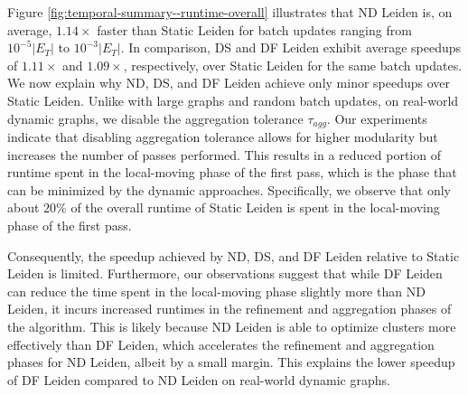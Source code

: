 Figure \ref{fig:temporal-summary--runtime-overall} illustrates that ND Leiden is, on average, $1.14\times$ faster than Static Leiden for batch updates ranging from $10^{-5}|E_T|$ to $10^{-3}|E_T|$. In comparison, DS and DF Leiden exhibit average speedups of $1.11\times$ and $1.09\times$, respectively, over Static Leiden for the same batch updates. We now explain why ND, DS, and DF Leiden achieve only minor speedups over Static Leiden. Unlike with large graphs and random batch updates, on real-world dynamic graphs, we disable the aggregation tolerance $\tau_{agg}$. Our experiments indicate that disabling aggregation tolerance allows for higher modularity but increases the number of passes performed. This results in a reduced portion of runtime spent in the local-moving phase of the first pass, which is the phase that can be minimized by the dynamic approaches. Specifically, we observe that only about $20\%$ of the overall runtime of Static Leiden is spent in the local-moving phase of the first pass. Consequently, the speedup achieved by ND, DS, and DF Leiden relative to Static Leiden is limited. Furthermore, our observations suggest that while DF Leiden can reduce the time spent in the local-moving phase slightly more than ND Leiden, it incurs increased runtimes in the refinement and aggregation phases of the algorithm. This is likely because ND Leiden is able to optimize clusters more effectively than DF Leiden, which accelerates the refinement and aggregation phases for ND Leiden, albeit by a small margin. This explains the lower speedup of DF Leiden compared to ND Leiden on real-world dynamic graphs.
